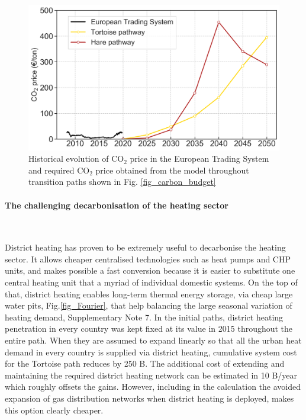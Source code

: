 \documentclass[5p]{elsarticle} %
\begin{document}
\begin{figure}[!h]
\centering
\includegraphics[width=\columnwidth]{figures/co2_price.png}
\caption{Historical evolution of CO$_2$ price in the European Trading System \cite{ETS} and required CO$_2$ price obtained from the model throughout transition paths shown in Fig. \ref{fig_carbon_budget}} \label{fig_co2price} 
\end{figure}


\paragraph{\textbf{The challenging decarbonisation of the heating sector}} \

District heating has proven to be extremely useful to decarbonise the heating sector. It allows cheaper centralised technologies such as heat pumps and CHP units, and makes possible a fast conversion because it is easier to substitute one central heating unit that a myriad of individual domestic systems. On the top of that, district heating enables long-term thermal energy storage, via cheap large water pits, Fig.\ref{fig_Fourier}, that help balancing the large seasonal variation of heating demand, Supplementary Note 7. In the initial paths, district heating penetration in every country was kept fixed at its value in 2015 \cite{DH_penetration} throughout the entire path. When they are assumed to expand linearly so that all the urban heat demand in every country is supplied via district heating, cumulative system cost for the Tortoise path reduces by 250 B\EUR. The additional cost of extending and maintaining the required district heating network can be estimated in 10 B\EUR/year \cite{Brown_2018} which roughly offsets the gains. However, including in the calculation the avoided expansion of gas distribution networks when district heating is deployed, makes this option clearly cheaper. 
\end{document}
